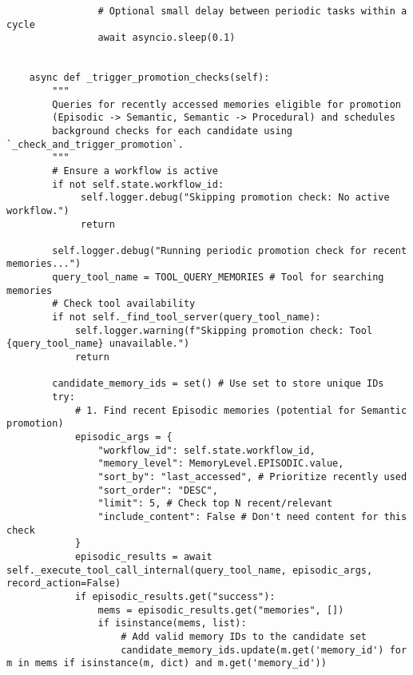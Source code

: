 \documentclass[12pt,a4paper]{article}
\begin{document}
\begin{pageablecode}
\begin{verbatim}
                # Optional small delay between periodic tasks within a cycle
                await asyncio.sleep(0.1)


    async def _trigger_promotion_checks(self):
        """
        Queries for recently accessed memories eligible for promotion
        (Episodic -> Semantic, Semantic -> Procedural) and schedules
        background checks for each candidate using `_check_and_trigger_promotion`.
        """
        # Ensure a workflow is active
        if not self.state.workflow_id:
             self.logger.debug("Skipping promotion check: No active workflow.")
             return

        self.logger.debug("Running periodic promotion check for recent memories...")
        query_tool_name = TOOL_QUERY_MEMORIES # Tool for searching memories
        # Check tool availability
        if not self._find_tool_server(query_tool_name):
            self.logger.warning(f"Skipping promotion check: Tool {query_tool_name} unavailable.")
            return

        candidate_memory_ids = set() # Use set to store unique IDs
        try:
            # 1. Find recent Episodic memories (potential for Semantic promotion)
            episodic_args = {
                "workflow_id": self.state.workflow_id,
                "memory_level": MemoryLevel.EPISODIC.value,
                "sort_by": "last_accessed", # Prioritize recently used
                "sort_order": "DESC",
                "limit": 5, # Check top N recent/relevant
                "include_content": False # Don't need content for this check
            }
            episodic_results = await self._execute_tool_call_internal(query_tool_name, episodic_args, record_action=False)
            if episodic_results.get("success"):
                mems = episodic_results.get("memories", [])
                if isinstance(mems, list):
                    # Add valid memory IDs to the candidate set
                    candidate_memory_ids.update(m.get('memory_id') for m in mems if isinstance(m, dict) and m.get('memory_id'))


\end{verbatim}
\end{pageablecode}
\end{document}
